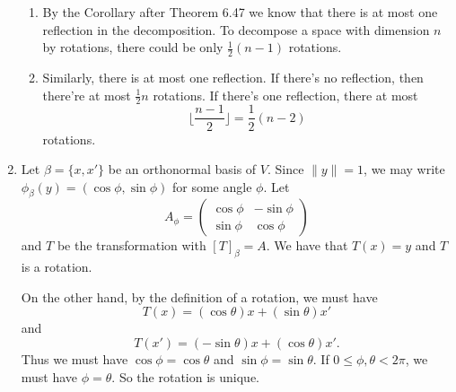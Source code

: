 \begin{enumerate}
\begin{enumerate}
\item By the Corollary after Theorem 6.47 we know that there is at most one reflection in the decomposition. To decompose a space with dimension $n$ by rotations, there could be only $\frac{1}{2}(n-1)$ rotations.
\item Similarly, there is at most one reflection. If there's no reflection, then there're at most $\frac{1}{2}n$ rotations. If there's one reflection, there at most 
\[\lfloor \frac{n-1}{2}\rfloor=\frac{1}{2}(n-2)\]
rotations.
\end{enumerate}
\item Let $\beta=\{x,x'\}$ be an orthonormal basis of $V$. Since $\|y\|=1$, we may write $\phi_{\beta}(y)=(\cos\phi,\sin\phi)$ for some angle $\phi$. Let 
\[A_{\phi}=\begin{pmatrix}\cos \phi&-\sin\phi\\\sin\phi&\cos\phi\end{pmatrix}\]
and $T$ be the transformation with $[T]_{\beta}=A$. We have that $T(x)=y$ and $T$ is a rotation.

On the other hand, by the definition of a rotation, we must have 
\[T(x)=(\cos\theta)x+(\sin\theta)x'\]
and 
\[T(x')=(-\sin\theta)x+(\cos\theta)x'.\]
Thus we must have $\cos\phi=\cos\theta$ and $\sin\phi=\sin\theta$. If $0\leq \phi,\theta <2\pi$, we must have $\phi=\theta$. So the rotation is unique.
\end{enumerate}